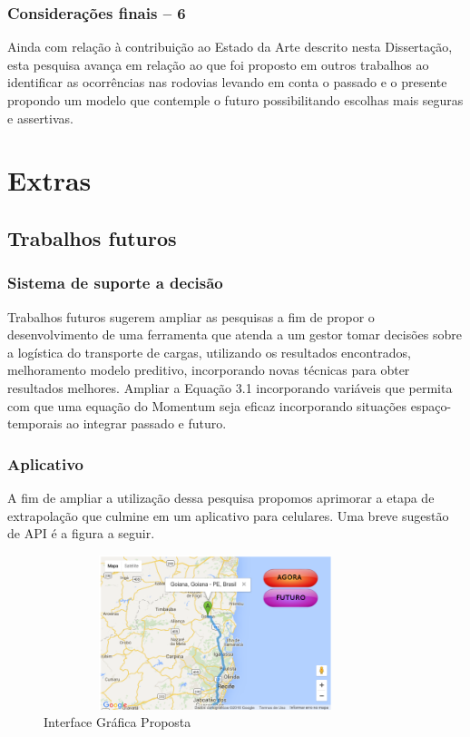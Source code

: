 \documentclass[11pt]{beamer}
\begin{document}
\begin{frame}
	\frametitle{Considerações finais -- 6}
	Ainda com relação à contribuição ao Estado da Arte descrito nesta Dissertação, esta pesquisa avança em relação ao que foi proposto em outros trabalhos ao identificar as ocorrências nas rodovias levando em conta o passado e o presente propondo um modelo que contemple o futuro possibilitando escolhas mais seguras e assertivas.
	
\end{frame}


\section{Extras}
\subsection{Trabalhos futuros}

\begin{frame}
	\frametitle{Sistema de suporte a decisão}
	Trabalhos futuros sugerem ampliar as pesquisas a fim de propor o desenvolvimento de uma ferramenta que atenda a um gestor tomar decisões sobre a logística do transporte de cargas, utilizando os resultados encontrados, melhoramento modelo preditivo, incorporando novas técnicas para obter resultados melhores. 
	Ampliar a Equação 3.1 incorporando variáveis que permita com que uma equação do Momentum seja eficaz incorporando situações espaço-temporais ao integrar passado e futuro.

	
\end{frame}

\begin{frame}\frametitle{ Aplicativo}
	\transboxout[duration=2, direction=25]
	A fim de ampliar a utilização dessa pesquisa propomos aprimorar a etapa de extrapolação que culmine em um aplicativo para celulares. Uma breve sugestão de API é a figura a seguir. 
	\begin{figure}[ht]
		\centering
		\includegraphics[width=100mm, height=45mm]{Figuras/Extras/InterfaceGrafica.png}
		\caption{ Interface Gráfica Proposta}		
	\end{figure}
\end{frame}
\end{document}
